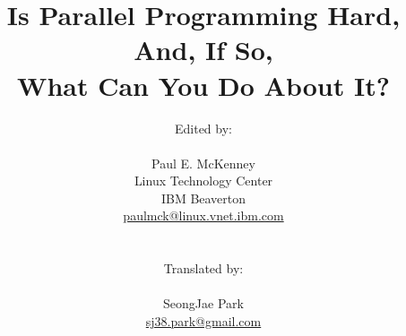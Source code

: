 \documentclass[10pt,twocolumn]{book}
\begin{document}
\makeatletter
\renewcommand\lstinline[1][]{%
\leavevmode\bgroup %
\def\lst@boxpos{b}%
\lsthk@PreSet\lstset{flexiblecolumns,#1}%
\lsthk@TextStyle
\ifnum\iffalse{\fi`}=\z@\fi
\@ifnextchar\bgroup{%
\ifnum`{=\z@}\fi%
\afterassignment\lst@InlineG \let\@let@token}{%
\ifnum`{=\z@}\fi\lstinline@}}
\makeatother
% ---  End of workaround for Fedora 23 Texlive bug
\newcommand{\co}[1]{\lstinline[breaklines=true,breakatwhitespace=true]{#1}}
\newcommand{\nbco}[1]{\hbox{\lstinline[breaklines=false,breakatwhitespace=false]{#1}}} % no break lines for short snippet
\newcommand{\qco}[1]{``\nbco{#1}''} % \nbco with quotation marks
\newcommand{\tco}[1]{\texttt{\detokenize{#1}}} % for code in tabular environment
% \tco{} will break at spaces but not at underscores
\newcommand{\nf}[1]{\textnormal{#1}} % to return to normal font
\newcommand{\qop}[1]{{\sffamily #1}} % QC operator such as H, T, S, etc.

\newcommand{\Epigraph}[2]{\epigraphhead[65]{\rmfamily\epigraph{#1}{#2}}}

 % Hyphenation exceptions for US English from hyphenex package
 % Hyphenation exceptions for perfbook

\title{
  Is Parallel Programming Hard, And, If So, \\
  What Can You Do About It?}
\author{
	Edited by: \\
	\\
	Paul E. McKenney \\
	Linux Technology Center \\
	IBM Beaverton \\
	\href{mailto:paulmck@linux.vnet.ibm.com}{paulmck@linux.vnet.ibm.com} \\
	\\
	\\
	Translated by: \\
	\\
	SeongJae Park \\
	\href{mailto:sj38.park@gmail.com}{sj38.park@gmail.com} \\
	\\
} %


\setcounter{topnumber}{3}
\renewcommand\topfraction{.75}
\setcounter{bottomnumber}{2}
\renewcommand\bottomfraction{.3}
\setcounter{totalnumber}{5}
\renewcommand\textfraction{.15}
\renewcommand\floatpagefraction{.5}
\setcounter{dbltopnumber}{3}
\renewcommand\dbltopfraction{.75}
\renewcommand\dblfloatpagefraction{.5}
\end{document}
